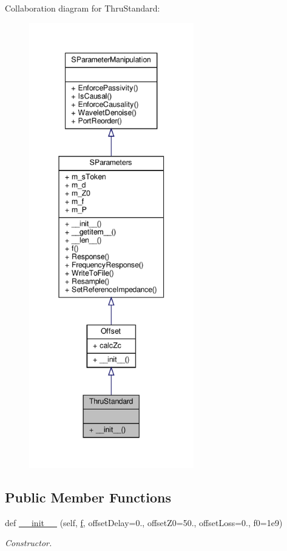 Collaboration diagram for Thru\+Standard\+:\nopagebreak
\begin{figure}[H]
\begin{center}
\leavevmode
\includegraphics[height=550pt]{classSignalIntegrity_1_1Measurement_1_1CalKit_1_1Standards_1_1ThruStandard_1_1ThruStandard__coll__graph}
\end{center}
\end{figure}
\subsection*{Public Member Functions}
\begin{DoxyCompactItemize}
\item 
def \hyperlink{classSignalIntegrity_1_1Measurement_1_1CalKit_1_1Standards_1_1ThruStandard_1_1ThruStandard_ad0a85daa668eb31179a32ff9d6235020}{\+\_\+\+\_\+init\+\_\+\+\_\+} (self, \hyperlink{classSignalIntegrity_1_1SParameters_1_1SParameters_1_1SParameters_a32e7a34d6837fe949b413c852a0447f8}{f}, offset\+Delay=0., offset\+Z0=50., offset\+Loss=0., f0=1e9)
\begin{DoxyCompactList}\small\item\em Constructor. \end{DoxyCompactList}\end{DoxyCompactItemize}


